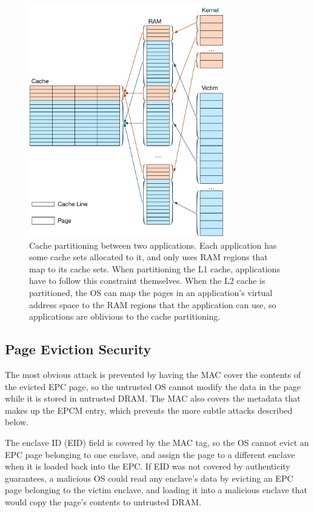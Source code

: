 \begin{figure}[hbt]
  \centering
  \includegraphics[width=85mm]{figures/cache_partitions.pdf}
  \caption{
    Cache partitioning between two applications. Each application has some
    cache sets allocated to it, and only uses RAM regions that map to its cache
    sets. When partitioning the L1 cache, applications have to follow this
    constraint themselves. When the L2 cache is partitioned, the OS can map the
    pages in an application's virtual address space to the RAM regions that the
    application can use, so applications are oblivious to the cache
    partitioning.
  }
  \label{fig:cache_partitions}
\end{figure}


\subsection {Page Eviction Security}

The most obvious attack is prevented by having the MAC cover the contents of
the evicted EPC page, so the untrusted OS cannot modify the data in the page
while it is stored in untrusted DRAM. The MAC also covers the metadata that
makes up the EPCM entry, which prevents the more subtle attacks described
below.

The enclave ID (EID) field is covered by the MAC tag, so the OS cannot evict an
EPC page belonging to one enclave, and assign the page to a different enclave
when it is loaded back into the EPC. If EID was not covered by authenticity
guarantees, a malicious OS could read any enclave's data by evicting an EPC
page belonging to the victim enclave, and loading it into a malicious enclave
that would copy the page's contents to untrusted DRAM.

